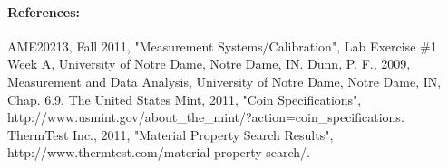 \documentclass[12pt, letterpaper]{article}
\begin{document}

\paragraph{References:}
\begingroup
   \def\section*#1{}%
\raggedright
\singlespacing
\begin{thebibliography}{}
    AME20213, Fall 2011, "Measurement  Systems/Calibration",
       Lab Exercise \#1 Week A, University of Notre Dame, Notre Dame, IN.
     Dunn, P. F., 2009, Measurement and Data Analysis,
       University of Notre Dame, Notre Dame, IN, Chap. 6.9.
    The United States Mint, 2011, "Coin Specifications",
        http://www.usmint.gov/about\_the\_mint/?action=coin\_specifications.
     ThermTest Inc., 2011, "Material Property Search Results",
        http://www.thermtest.com/material-property-search/.
\end{thebibliography}
\endgroup
\end{document}
